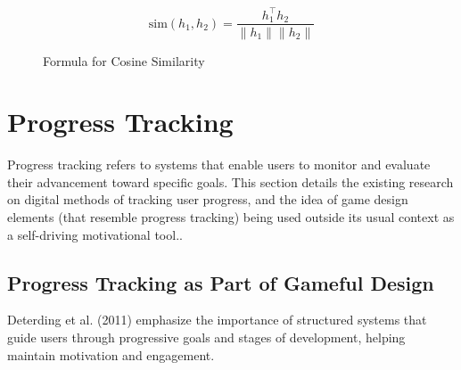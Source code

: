 
\begin{figure}[ht!]
    \centering
    \[
    \text{sim}(h_1, h_2) = \frac{h_1^\top h_2}{\|h_1\|\|h_2\|}
    \]
    {\color{maroon}\scriptsize\caption[Formula for Cosine Similarity]{Formula for Cosine Similarity}}
    \label{fig:cosine_similarity}
\end{figure}



\section{Progress Tracking}

Progress tracking refers to systems that enable users to monitor and evaluate their advancement toward specific goals. This section details the existing research on digital methods of tracking user progress, and the idea of game design elements (that resemble progress tracking) being used outside its usual context as a self-driving motivational tool..

\subsection{Progress Tracking as Part of Gameful Design}

Deterding et al. (2011) emphasize the importance of structured systems that guide users through progressive goals and stages of development, helping maintain motivation and engagement.

